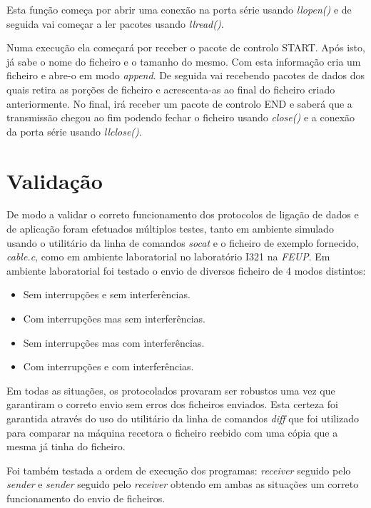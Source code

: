 \documentclass[a4paper,11pt,portuguese]{article}
\begin{document}
    \noindent Esta função começa por abrir uma conexão na porta série usando \textit{llopen()}
    e de seguida vai começar a ler pacotes usando \textit{llread()}.

    Numa execução ela começará por receber o pacote de controlo START. Após isto, já sabe o nome do ficheiro
    e o tamanho do mesmo. Com esta informação cria um ficheiro e abre-o em modo \textit{append}.
    De seguida vai recebendo pacotes de dados dos quais retira as porções de ficheiro e acrescenta-as ao
    final do ficheiro criado anteriormente. No final, irá receber um pacote de controlo END e saberá
    que a transmissão chegou ao fim podendo fechar o ficheiro usando \textit{close()} e a conexão da porta série
    usando \textit{llclose()}.


\section{Validação}

    De modo a validar o correto funcionamento dos protocolos de ligação de dados
    e de aplicação foram efetuados múltiplos testes, tanto em ambiente simulado usando
    o utilitário da linha de comandos \textit{socat} e o ficheiro de exemplo fornecido,
    \textit{cable.c}, como em ambiente laboratorial no laboratório I321 na
    \textit{FEUP}. Em ambiente laboratorial foi testado o envio de diversos ficheiro
    de 4 modos distintos:

    \begin{itemize}
        \item Sem interrupções e sem interferências.
        \item Com interrupções mas sem interferências.
        \item Sem interrupções mas com interferências.
        \item Com interrupções e com interferências.
    \end{itemize}

    Em todas as situações, os protocolados provaram ser robustos uma vez que garantiram o
    correto envio sem erros dos ficheiros enviados. Esta certeza foi garantida através do
    uso do utilitário da linha de comandos \textit{diff} que foi utilizado para comparar
    na máquina recetora o ficheiro reebido com uma cópia que a mesma já tinha do ficheiro. \par

    Foi também testada a ordem de execução dos programas: \textit{receiver} seguido pelo
    \textit{sender} e \textit{sender} seguido pelo \textit{receiver} obtendo
    em ambas as situações um correto funcionamento do envio de ficheiros.
\end{document}
